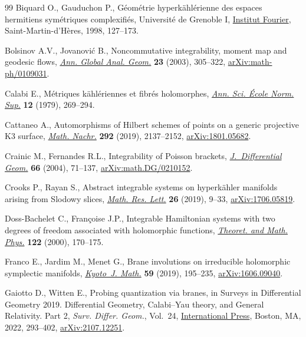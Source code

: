 \documentclass[pdftex]{sigma}
\numberwithin{equation}{section}
\begin{document}
\begin{thebibliography}{99}
Biquard O., Gauduchon P., G\'eom\'etrie hyperk\"ahl\'erienne des espaces
 hermitiens sym\'etriques complexifi\'es, Universit\'e de Grenoble I, \href{https://doi.org/10.5802/tsg.199}{Institut
 Fourier}, Saint-Martin-d'H\`eres, 1998, 127--173.

Bolsinov A.V., Jovanovi\'c B., Noncommutative integrability, moment map and
 geodesic flows, \href{https://doi.org/10.1023/A:1023023300665}{\textit{Ann. Global Anal. Geom.}} \textbf{23} (2003),
 305--322, \href{https://arxiv.org/abs/math-ph/0109031}{arXiv:math-ph/0109031}.

Calabi E., M\'etriques k\"ahl\'eriennes et fibr\'es holomorphes, \href{https://doi.org/10.24033/asens.1367}{\textit{Ann.
 Sci. \'{E}cole Norm. Sup.}} \textbf{12} (1979), 269--294.

Cattaneo A., Automorphisms of {H}ilbert schemes of points on a generic
 projective {K}3 surface, \href{https://doi.org/10.1002/mana.201800557}{\textit{Math. Nachr.}} \textbf{292} (2019),
 2137--2152, \href{https://arxiv.org/abs/1801.05682}{arXiv:1801.05682}.

Crainic M., Fernandes R.L., Integrability of {P}oisson brackets,
 \href{https://doi.org/10.4310/jdg/1090415030}{\textit{J.~Differential Geom.}} \textbf{66} (2004), 71--137,
 \href{https://arxiv.org/abs/math.DG/0210152}{arXiv:math.DG/0210152}.

Crooks P., Rayan S., Abstract integrable systems on hyperk\"ahler manifolds
 arising from {S}lodowy slices, \href{https://doi.org/10.4310/MRL.2019.v26.n1.a2}{\textit{Math. Res. Lett.}} \textbf{26} (2019),
 9--33, \href{https://arxiv.org/abs/1706.05819}{arXiv:1706.05819}.

Doss-Bachelet C., Fran\c{c}oise J.P., Integrable {H}amiltonian systems with two
 degrees of freedom associated with holomorphic functions, \href{https://doi.org/10.1007/BF02551194}{\textit{Theoret.
 and Math. Phys.}} \textbf{122} (2000), 170--175.

Franco E., Jardim M., Menet G., Brane involutions on irreducible holomorphic
 symplectic manifolds, \href{https://doi.org/10.1215/21562261-2018-0009}{\textit{Kyoto~J. Math.}} \textbf{59} (2019), 195--235,
 \href{https://arxiv.org/abs/1606.09040}{arXiv:1606.09040}.

Gaiotto D., Witten E., Probing quantization via branes, in Surveys in
 Differential Geometry 2019. {D}ifferential Geometry, {C}alabi--{Y}au theory,
 and General Relativity. {P}art 2, \textit{Surv. Differ. Geom.}, Vol.~24,
 \href{https://doi.org/10.4310/SDG.2019.v24.n1.a8}{International Press}, Boston, MA, 2022, 293--402, \href{https://arxiv.org/abs/2107.12251}{arXiv:2107.12251}.


\end{thebibliography}
\end{document}
